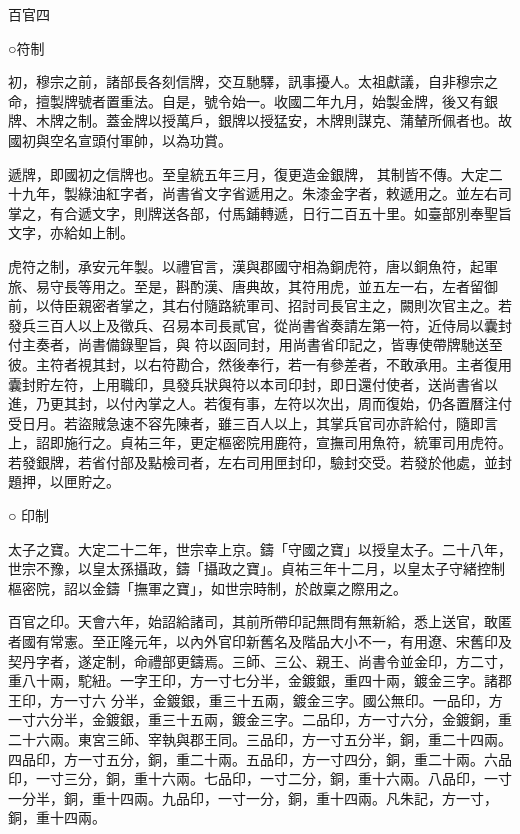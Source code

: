 
\begin{pinyinscope}

 百官四



 ○符制



 初，穆宗之前，諸部長各刻信牌，交互馳驛，訊事擾人。太祖獻議，自非穆宗之命，擅製牌號者置重法。自是，號令始一。收國二年九月，始製金牌，後又有銀牌、木牌之制。蓋金牌以授萬戶，銀牌以授猛安，木牌則謀克、蒲輦所佩者也。故國初與空名宣頭付軍帥，以為功賞。



 遞牌，即國初之信牌也。至皇統五年三月，復更造金銀牌，
 其制皆不傳。大定二十九年，製綠油紅字者，尚書省文字省遞用之。朱漆金字者，敕遞用之。並左右司掌之，有合遞文字，則牌送各部，付馬鋪轉遞，日行二百五十里。如臺部別奉聖旨文字，亦給如上制。



 虎符之制，承安元年製。以禮官言，漢與郡國守相為銅虎符，唐以銅魚符，起軍旅、易守長等用之。至是，斟酌漢、唐典故，其符用虎，並五左一右，左者留御前，以侍臣親密者掌之，其右付隨路統軍司、招討司長官主之，闕則次官主之。若發兵三百人以上及徵兵、召易本司長貳官，從尚書省奏請左第一符，近侍局以囊封付主奏者，尚書備錄聖旨，與
 符以函同封，用尚書省印記之，皆專使帶牌馳送至彼。主符者視其封，以右符勘合，然後奉行，若一有參差者，不敢承用。主者復用囊封貯左符，上用職印，具發兵狀與符以本司印封，即日還付使者，送尚書省以進，乃更其封，以付內掌之人。若復有事，左符以次出，周而復始，仍各置曆注付受日月。若盜賊急速不容先陳者，雖三百人以上，其掌兵官司亦許給付，隨即言上，詔即施行之。貞祐三年，更定樞密院用鹿符，宣撫司用魚符，統軍司用虎符。若發銀牌，若省付部及點檢司者，左右司用匣封印，驗封交受。若發於他處，並封題押，以匣貯之。



 ○
 印制



 太子之寶。大定二十二年，世宗幸上京。鑄「守國之寶」以授皇太子。二十八年，世宗不豫，以皇太孫攝政，鑄「攝政之寶」。貞祐三年十二月，以皇太子守緒控制樞密院，詔以金鑄「撫軍之寶」，如世宗時制，於啟稟之際用之。



 百官之印。天會六年，始詔給諸司，其前所帶印記無問有無新給，悉上送官，敢匿者國有常憲。至正隆元年，以內外官印新舊名及階品大小不一，有用遼、宋舊印及契丹字者，遂定制，命禮部更鑄焉。三師、三公、親王、尚書令並金印，方二寸，重八十兩，駝紐。一字王印，方一寸七分半，金鍍銀，重四十兩，鍍金三字。諸郡王印，方一寸六
 分半，金鍍銀，重三十五兩，鍍金三字。國公無印。一品印，方一寸六分半，金鍍銀，重三十五兩，鍍金三字。二品印，方一寸六分，金鍍銅，重二十六兩。東宮三師、宰執與郡王同。三品印，方一寸五分半，銅，重二十四兩。四品印，方一寸五分，銅，重二十兩。五品印，方一寸四分，銅，重二十兩。六品印，一寸三分，銅，重十六兩。七品印，一寸二分，銅，重十六兩。八品印，一寸一分半，銅，重十四兩。九品印，一寸一分，銅，重十四兩。凡朱記，方一寸，銅，重十四兩。




\end{pinyinscope}
